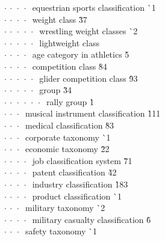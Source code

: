 \begin{tabbing}
$\cdot\:\cdot\:\cdot\:\cdot\:$  equestrian sports classification  \` {\raisebox{.4\height}{\scalebox{.6}{+}}}1\\
$\cdot\:\cdot\:\cdot\:\cdot\:$  weight class  \` 3{\raisebox{.4\height}{\scalebox{.6}{+}}}7\\
$\cdot\:\cdot\:\cdot\:\cdot\:\cdot\:$  wrestling weight classes  \` {\raisebox{.4\height}{\scalebox{.6}{+}}}2\\
$\cdot\:\cdot\:\cdot\:\cdot\:\cdot\:$  lightweight class  \` \\
$\cdot\:\cdot\:\cdot\:\cdot\:$  age category in athletics  \` 5\\
$\cdot\:\cdot\:\cdot\:\cdot\:$  competition class  \` 84\\
$\cdot\:\cdot\:\cdot\:\cdot\:\cdot\:$  glider competition class  \` 9{\raisebox{.4\height}{\scalebox{.6}{+}}}3\\
$\cdot\:\cdot\:\cdot\:\cdot\:\cdot\:$  group  \` 3{\raisebox{.4\height}{\scalebox{.6}{+}}}4\\
$\cdot\:\cdot\:\cdot\:\cdot\:\cdot\:\cdot\:$  rally group  \` 1\\
$\cdot\:\cdot\:\cdot\:$  musical instrument classification  \` 1{\raisebox{.4\height}{\scalebox{.6}{+}}}11\\
$\cdot\:\cdot\:\cdot\:$  medical classification  \` 8{\raisebox{.4\height}{\scalebox{.6}{+}}}3\\
$\cdot\:\cdot\:\cdot\:$  corporate taxonomy  \` {\raisebox{.4\height}{\scalebox{.6}{+}}}1\\
$\cdot\:\cdot\:\cdot\:$  economic taxonomy  \` 2{\raisebox{.4\height}{\scalebox{.6}{+}}}2\\
$\cdot\:\cdot\:\cdot\:\cdot\:$  job classification system  \` 7{\raisebox{.4\height}{\scalebox{.6}{+}}}1\\
$\cdot\:\cdot\:\cdot\:\cdot\:$  patent classification  \` 4{\raisebox{.4\height}{\scalebox{.6}{+}}}2\\
$\cdot\:\cdot\:\cdot\:\cdot\:$  industry classification  \` 18{\raisebox{.4\height}{\scalebox{.6}{+}}}3\\
$\cdot\:\cdot\:\cdot\:\cdot\:$  product classification  \` {\raisebox{.4\height}{\scalebox{.6}{+}}}1\\
$\cdot\:\cdot\:\cdot\:$  military taxonomy  \` {\raisebox{.4\height}{\scalebox{.6}{+}}}2\\
$\cdot\:\cdot\:\cdot\:\cdot\:$  military casualty classification  \` 6\\
$\cdot\:\cdot\:\cdot\:$  safety taxonomy  \` {\raisebox{.4\height}{\scalebox{.6}{+}}}1\\

\end{tabbing}
